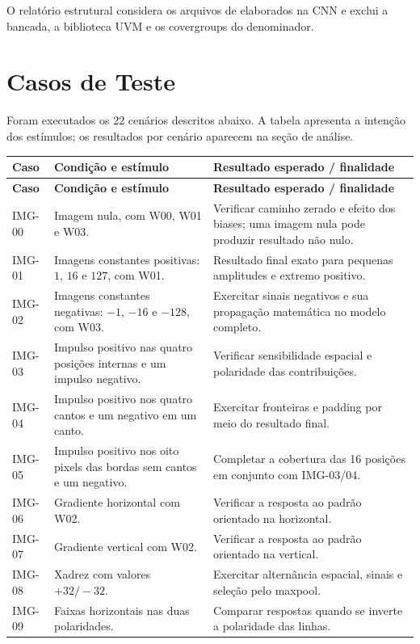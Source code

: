 \documentclass[12pt,a4paper]{article}
\newcommand{\arquivo}[1]{\texttt{\detokenize{#1}}}
\begin{document}
O relatório estrutural considera os arquivos de \arquivo{src} elaborados na CNN e exclui a bancada, a biblioteca UVM e os covergroups do denominador.

\section{Casos de Teste}
Foram executados os 22 cenários descritos abaixo. A tabela apresenta a intenção dos estímulos; os resultados por cenário aparecem na seção de análise.

\small
\begin{longtable}{p{1.5cm}p{10.8cm}p{10.8cm}}
\toprule\textbf{Caso} & \textbf{Condição e estímulo} & \textbf{Resultado esperado / finalidade}\\\midrule
\endfirsthead
\toprule\textbf{Caso} & \textbf{Condição e estímulo} & \textbf{Resultado esperado / finalidade}\\\midrule
\endhead
IMG-00 & Imagem nula, com W00, W01 e W03. & Verificar caminho zerado e efeito dos biases; uma imagem nula pode produzir resultado não nulo.\\
IMG-01 & Imagens constantes positivas: $1$, $16$ e $127$, com W01. & Resultado final exato para pequenas amplitudes e extremo positivo.\\
IMG-02 & Imagens constantes negativas: $-1$, $-16$ e $-128$, com W03. & Exercitar sinais negativos e sua propagação matemática no modelo completo.\\
IMG-03 & Impulso positivo nas quatro posições internas e um impulso negativo. & Verificar sensibilidade espacial e polaridade das contribuições.\\
IMG-04 & Impulso positivo nos quatro cantos e um negativo em um canto. & Exercitar fronteiras e padding por meio do resultado final.\\
IMG-05 & Impulso positivo nos oito pixels das bordas sem cantos e um negativo. & Completar a cobertura das 16 posições em conjunto com IMG-03/04.\\
IMG-06 & Gradiente horizontal com W02. & Verificar a resposta ao padrão orientado na horizontal.\\
IMG-07 & Gradiente vertical com W02. & Verificar a resposta ao padrão orientado na vertical.\\
IMG-08 & Xadrez com valores $+32/-32$. & Exercitar alternância espacial, sinais e seleção pelo maxpool.\\
IMG-09 & Faixas horizontais nas duas polaridades. & Comparar respostas quando se inverte a polaridade das linhas.\\

\end{longtable}
\end{document}
